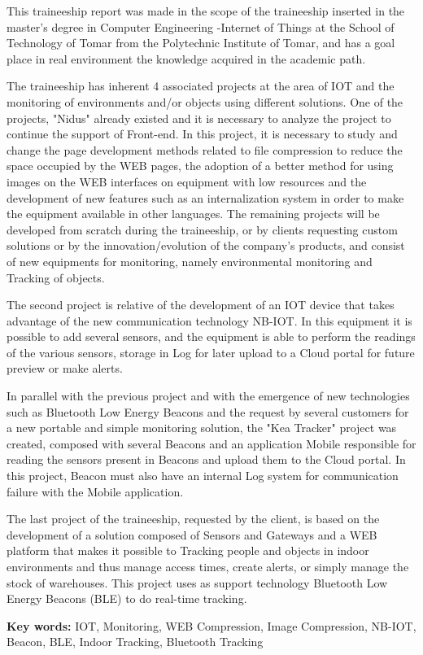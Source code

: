 
\vspace{1cm}
\noindent
\textbf{} 

\par This traineeship report was made in the scope of the traineeship inserted in the master's degree in Computer Engineering -Internet of Things at the School of Technology of Tomar from the Polytechnic Institute of Tomar, and has a goal place in real environment the knowledge acquired in the academic path.

\par The traineeship has inherent 4 associated projects at the area of IOT and the monitoring of environments and/or objects using different solutions. One of the projects, "Nidus" already existed and it is necessary to analyze the project to continue the support of Front-end. In this project, it is necessary to study and change the page development methods related to file compression to reduce the space occupied by the WEB pages, the adoption of a better method for using images on the WEB interfaces on equipment with low resources and the development of new features such as an internalization system in order to make the equipment available in other languages. The remaining projects will be developed from scratch during the traineeship, or by clients requesting custom solutions or by the innovation/evolution of the company's products, and consist of new equipments for monitoring, namely environmental monitoring and Tracking of objects.

\par The second project is relative of the development of an IOT device that takes advantage of the new communication technology NB-IOT. In this equipment it is possible to add several sensors, and the equipment is able to perform the readings of the various sensors, storage in Log for later upload to a Cloud portal for future preview or make alerts.
\par In parallel with the previous project and with the emergence of new technologies such as Bluetooth Low Energy Beacons and the request by several customers for a new portable and simple monitoring solution, the "Kea Tracker" project was created, composed with several Beacons and an application Mobile responsible for reading the sensors present in Beacons and upload them to the Cloud portal. In this project, Beacon must also have an internal Log system for communication failure with the Mobile application.
\par The last project of the traineeship, requested by the client, is based on the development of a solution composed of Sensors and Gateways and a WEB platform that makes it possible to Tracking people and objects in indoor environments and thus manage access times, create alerts, or simply manage the stock of warehouses. This project uses as support technology Bluetooth Low Energy Beacons (BLE) to do real-time tracking.

\bigskip

\textbf{Key words:} 
IOT, Monitoring, WEB Compression, Image Compression, NB-IOT, Beacon, BLE, Indoor Tracking, Bluetooth Tracking